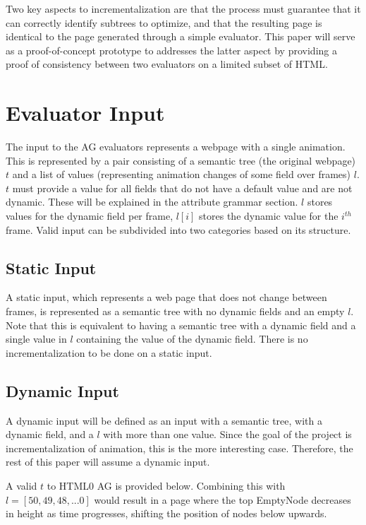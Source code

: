 \documentclass[11pt]{article}
\begin{document}
Two key aspects to incrementalization are that the process must guarantee that it can correctly identify subtrees to optimize, and that the resulting page is identical to the page generated through a simple evaluator. This paper will serve as a proof-of-concept prototype to addresses the latter aspect by providing a proof of consistency between  two evaluators on a limited subset of HTML.

\section{Evaluator Input}

The input to the AG evaluators represents a webpage with a single animation. This is represented by a pair consisting of a semantic tree (the original webpage) $t$ and a list of values (representing animation changes of some field over frames) $l$. $t$ must provide a value for all fields that do not have a default value and are not dynamic. These will be explained in the attribute grammar section. $l$ stores values for the dynamic field per frame, $l[i]$ stores the dynamic value for the $i^{th}$ frame. Valid input can be subdivided into two categories based on its structure.

\subsection{Static Input}

A static input, which represents a web page that does not change between frames, is represented as a semantic tree with no dynamic fields and an empty $l$. Note that this is equivalent to having a semantic tree with a dynamic field and a single value in $l$ containing the value of the dynamic field. There is no incrementalization to be done on a static input.

\subsection{Dynamic Input}

A dynamic input will be defined as an input with a semantic tree, with a dynamic field, and a $l$ with more than one value. Since the goal of the project is incrementalization of animation, this is the more interesting case. Therefore, the rest of this paper will assume a dynamic input.

A valid $t$ to HTML0 AG is provided below. Combining this with $l = [50, 49, 48, ... 0]$ would result in a page where the top EmptyNode decreases in height as time progresses, shifting the position of nodes below upwards.
\end{document}
